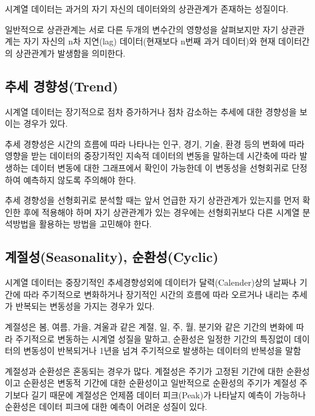 \documentclass[
]{book}
\begin{document}
시계열 데이터는 과거의 자기 자신의 데이터와의 상관관계가 존재하는 성질이다.

일반적으로 상관관계는 서로 다른 두개의 변수간의 영향성을 살펴보지만 자기 상관관계는 자기 자신의 n차 지연(lag) 데이터(현재보다 n번째 과거 데이터)와 현재 데이터간의 상관관계가 발생함을 의미한다.

\hypertarget{uxcd94uxc138-uxacbduxd5a5uxc131trend}{%
\subsection{추세 경향성(Trend)}\label{uxcd94uxc138-uxacbduxd5a5uxc131trend}}

시계열 데이터는 장기적으로 점차 증가하거나 점차 감소하는 추세에 대한 경향성을 보이는 경우가 있다.

추세 경향성은 시간의 흐름에 따라 나타나는 인구, 경기, 기술, 환경 등의 변화에 따라 영향을 받는 데이터의 중장기적인 지속적 데이터의 변동을 말하는데 시간축에 따라 발생하는 데이터 변동에 대한 그래프에서 확인이 가능한데 이 변동성을 선형회귀로 단정하여 예측하지 않도록 주의해야 한다.

추세 경향성을 선형회귀로 분석할 때는 앞서 언급한 자기 상관관계가 있는지를 먼저 확인한 후에 적용해야 하며 자기 상관관계가 있는 경우에는 선형회귀보다 다른 시계열 분석방법을 활용하는 방법을 고민해야 한다.

\hypertarget{uxacc4uxc808uxc131seasonality-uxc21cuxd658uxc131cyclic}{%
\subsection{계절성(Seasonality), 순환성(Cyclic)}\label{uxacc4uxc808uxc131seasonality-uxc21cuxd658uxc131cyclic}}

시계열 데이터는 중장기적인 추세경향성외에 데이터가 달력(Calender)상의 날짜나 기간에 따라 주기적으로 변화하거나 장기적인 시간의 흐름에 따라 오르거나 내리는 추세가 반복되는 변동성을 가지는 경우가 있다.

계절성은 봄, 여름, 가을, 겨울과 같은 계절, 일, 주, 월, 분기와 같은 기간의 변화에 따라 주기적으로 변동하는 시계열 성질을 말하고, 순환성은 일정한 기간의 특징없이 데이터의 변동성이 반복되거나 1년을 넘겨 주기적으로 발생하는 데이터의 반복성을 말함

계절성과 순환성은 혼동되는 경우가 많다. 계절성은 주기가 고정된 기간에 대한 순환성이고 순환성은 변동적 기간에 대한 순환성이고 일반적으로 순환성의 주기가 계절성 주기보다 길기 때문에 계절성은 언제쯤 데이터 피크(Peak)가 나타날지 예측이 가능하나 순환성은 데이터 피크에 대한 예측이 어려운 성질이 있다.
\end{document}
